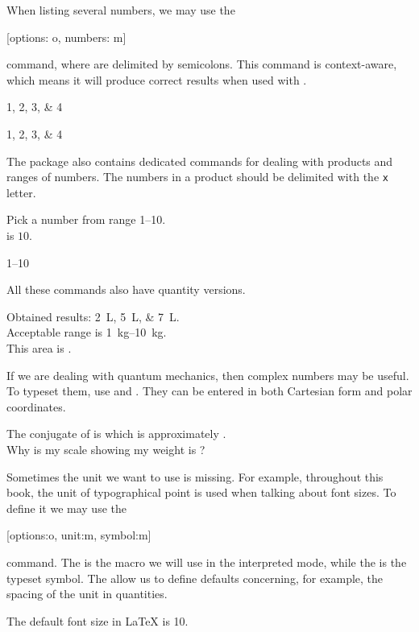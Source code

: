 When listing several numbers, we may use the
\begin{lscommand}
  [options: o, numbers: m]
\end{lscommand}
command, where  are delimited by semicolons. This command is
context-aware, which means it will produce correct results when used with
.
\begin{example}
\numlist{1;2;3;4}

\begin{german}
  \numlist{1;2;3;4}
\end{german}
\end{example}

The package also contains dedicated commands for dealing with products and
ranges of numbers. The numbers in a product should be delimited with the
\verb|x| letter.
\begin{example}
Pick a number from
range \numrange{1}{10}. \\
 is \(10\). \\
\begin{german}
  \numrange{1}{10}
\end{german}
\end{example}

All these commands also have quantity versions.
\begin{example}
Obtained results:
\qtylist{2;5;7}{\L}.\\
Acceptable range is
\qtyrange{1}{10}{\kg}. \\
This area is
.
\end{example}

If we are dealing with quantum mechanics, then complex numbers may be useful. To
typeset them, use  and . They can be entered in
both Cartesian form and polar coordinates.
\begin{example}[examplewidth=0.5\linewidth]
The conjugate of
 is
which is approximately
. \\
Why is my scale showing my
weight is
?
\end{example}

Sometimes the unit we want to use is missing. For example,
throughout this book, the unit of typographical point is used when talking about
font sizes. To define it we may use the
\begin{lscommand}
  [options:o, unit:m, symbol:m]
\end{lscommand}
command. The  is the macro we will use in the interpreted mode,
while the  is the typeset symbol. The  allow us to
define defaults concerning, for example, the spacing of the unit in
quantities.
\begin{example}
The default font size
in \LaTeX{} is \qty{10}{\pt}.
\end{example}

